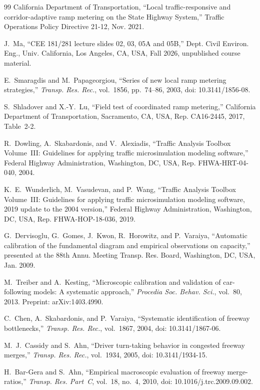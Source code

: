 \documentclass[11pt,letterpaper]{article}
\begin{document}
\begin{thebibliography}{99}
California Department of Transportation, ``Local traffic-responsive and
corridor-adaptive ramp metering on the State Highway System,'' Traffic Operations
Policy Directive 21-12, Nov. 2021.

J.~Ma, ``CEE 181/281 lecture slides 02, 03, 05A and 05B,'' Dept. Civil Environ. Eng.,
Univ. California, Los Angeles, CA, USA, Fall 2026, unpublished course material.

E.~Smaragdis and M.~Papageorgiou, ``Series of new local ramp metering strategies,''
\emph{Transp. Res. Rec.}, vol.~1856, pp.~74--86, 2003, doi: 10.3141/1856-08.

S.~Shladover and X.-Y.~Lu, ``Field test of coordinated ramp metering,'' California
Department of Transportation, Sacramento, CA, USA, Rep. CA16-2445, 2017, Table~2-2.

R.~Dowling, A.~Skabardonis, and V.~Alexiadis, ``Traffic Analysis Toolbox Volume~III:
Guidelines for applying traffic microsimulation modeling software,'' Federal Highway
Administration, Washington, DC, USA, Rep. FHWA-HRT-04-040, 2004.

K.~E.~Wunderlich, M.~Vasudevan, and P.~Wang, ``Traffic Analysis Toolbox Volume~III:
Guidelines for applying traffic microsimulation modeling software, 2019 update to the
2004 version,'' Federal Highway Administration, Washington, DC, USA,
Rep. FHWA-HOP-18-036, 2019.

G.~Dervisoglu, G.~Gomes, J.~Kwon, R.~Horowitz, and P.~Varaiya, ``Automatic calibration
of the fundamental diagram and empirical observations on capacity,'' presented at the
88th Annu. Meeting Transp. Res. Board, Washington, DC, USA, Jan. 2009.

M.~Treiber and A.~Kesting, ``Microscopic calibration and validation of car-following
models: A systematic approach,'' \emph{Procedia Soc. Behav. Sci.}, vol.~80, 2013.
Preprint: arXiv:1403.4990.

C.~Chen, A.~Skabardonis, and P.~Varaiya, ``Systematic identification of freeway
bottlenecks,'' \emph{Transp. Res. Rec.}, vol.~1867, 2004, doi: 10.3141/1867-06.

M.~J.~Cassidy and S.~Ahn, ``Driver turn-taking behavior in congested freeway merges,''
\emph{Transp. Res. Rec.}, vol.~1934, 2005, doi: 10.3141/1934-15.

H.~Bar-Gera and S.~Ahn, ``Empirical macroscopic evaluation of freeway merge-ratios,''
\emph{Transp. Res. Part~C}, vol.~18, no.~4, 2010, doi: 10.1016/j.trc.2009.09.002.
\end{thebibliography}
\end{document}
